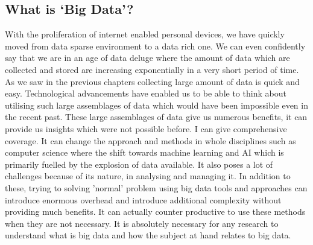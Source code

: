 
\subsection{What is `Big Data'?}

With the proliferation of internet enabled personal devices, we have quickly moved from data sparse environment to a data rich one.
We can even confidently say that we are in an age of data deluge where the amount of data which are collected and stored are increasing exponentially in a very short period of time.
As we saw in the previous chapters collecting large amount of data is quick and easy.
Technological advancements have enabled us to be able to think about utilising such large assemblages of data which would have been impossible even in the recent past.
These large assemblages of data give us numerous benefits, it can provide us insights which were not possible before.
I can give comprehensive coverage.
It can change the approach and methods in whole disciplines such as computer science where the shift towards machine learning and AI which is primarily fuelled by the explosion of data available.
It also poses a lot of challenges because of its nature, in analysing and managing it.
In addition to these, trying to solving 'normal' problem using big data tools and approaches can introduce enormous overhead and introduce additional complexity without providing much benefits.
It can actually counter productive to use these methods when they are not necessary.
It is absolutely necessary for any research to understand what is big data and how the subject at hand relates to big data.

